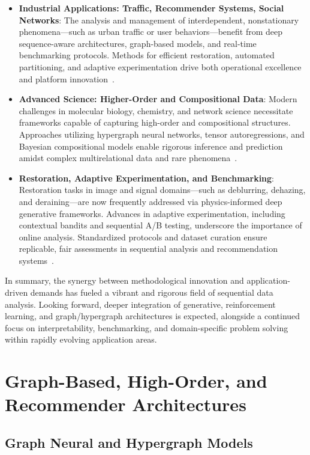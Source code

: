 \documentclass[sigconf]{acmart}
\begin{document}
\begin{itemize}
    \item \textbf{Industrial Applications: Traffic, Recommender Systems, Social Networks}: The analysis and management of interdependent, nonstationary phenomena—such as urban traffic or user behaviors—benefit from deep sequence-aware architectures, graph-based models, and real-time benchmarking protocols. Methods for efficient restoration, automated partitioning, and adaptive experimentation drive both operational excellence and platform innovation~\cite{ref2,ref9,ref47,ref58,ref85,ref87}.
    
    \item \textbf{Advanced Science: Higher-Order and Compositional Data}: Modern challenges in molecular biology, chemistry, and network science necessitate frameworks capable of capturing high-order and compositional structures. Approaches utilizing hypergraph neural networks, tensor autoregressions, and Bayesian compositional models enable rigorous inference and prediction amidst complex multirelational data and rare phenomena~\cite{ref58,ref59,ref60,ref61,ref65,ref74}.
    
    \item \textbf{Restoration, Adaptive Experimentation, and Benchmarking}: Restoration tasks in image and signal domains—such as deblurring, dehazing, and deraining—are now frequently addressed via physics-informed deep generative frameworks. Advances in adaptive experimentation, including contextual bandits and sequential A/B testing, underscore the importance of online analysis. Standardized protocols and dataset curation ensure replicable, fair assessments in sequential analysis and recommendation systems~\cite{ref74,ref80,ref81,ref85,ref86,ref87}.
\end{itemize}

\noindent In summary, the synergy between methodological innovation and application-driven demands has fueled a vibrant and rigorous field of sequential data analysis. Looking forward, deeper integration of generative, reinforcement learning, and graph/hypergraph architectures is expected, alongside a continued focus on interpretability, benchmarking, and domain-specific problem solving within rapidly evolving application areas.

\section{Graph-Based, High-Order, and Recommender Architectures}

\subsection{Graph Neural and Hypergraph Models}
\end{document}
